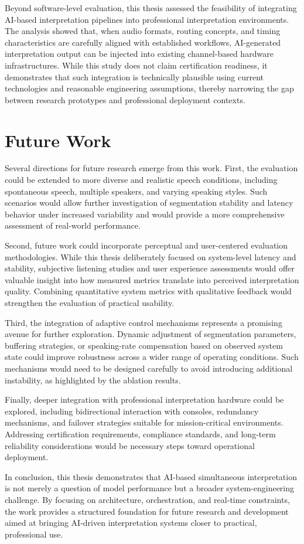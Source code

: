 Beyond software-level evaluation, this thesis assessed the feasibility of integrating AI-based interpretation pipelines into professional interpretation environments. The analysis showed that, when audio formats, routing concepts, and timing characteristics are carefully aligned with established workflows, AI-generated interpretation output can be injected into existing channel-based hardware infrastructures. While this study does not claim certification readiness, it demonstrates that such integration is technically plausible using current technologies and reasonable engineering assumptions, thereby narrowing the gap between research prototypes and professional deployment contexts.

\section*{Future Work}

Several directions for future research emerge from this work. First, the evaluation could be extended to more diverse and realistic speech conditions, including spontaneous speech, multiple speakers, and varying speaking styles. Such scenarios would allow further investigation of segmentation stability and latency behavior under increased variability and would provide a more comprehensive assessment of real-world performance.

Second, future work could incorporate perceptual and user-centered evaluation methodologies. While this thesis deliberately focused on system-level latency and stability, subjective listening studies and user experience assessments would offer valuable insight into how measured metrics translate into perceived interpretation quality. Combining quantitative system metrics with qualitative feedback would strengthen the evaluation of practical usability.

Third, the integration of adaptive control mechanisms represents a promising avenue for further exploration. Dynamic adjustment of segmentation parameters, buffering strategies, or speaking-rate compensation based on observed system state could improve robustness across a wider range of operating conditions. Such mechanisms would need to be designed carefully to avoid introducing additional instability, as highlighted by the ablation results.

Finally, deeper integration with professional interpretation hardware could be explored, including bidirectional interaction with consoles, redundancy mechanisms, and failover strategies suitable for mission-critical environments. Addressing certification requirements, compliance standards, and long-term reliability considerations would be necessary steps toward operational deployment.

In conclusion, this thesis demonstrates that AI-based simultaneous interpretation is not merely a question of model performance but a broader system-engineering challenge. By focusing on architecture, orchestration, and real-time constraints, the work provides a structured foundation for future research and development aimed at bringing AI-driven interpretation systems closer to practical, professional use.

